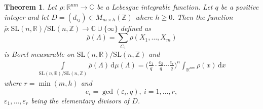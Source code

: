 \documentclass[11pt]{article}
\newtheorem{theorem}{Theorem}[section]
\theoremstyle{definition}
\theoremstyle{proof}
\begin{document}
\begin{theorem}\label{thmii}
    Let $\rho : \mathbb{R}^{nm} \to \mathbb{C}$ be a Lebesgue integrable function.
    Let $q$ be a positive integer and let $D = (d_{ij}) \in M_{m \times h}(\mathbb{Z})$ where $h \geq 0$.
    Then the function $\bar{\rho } : \mathrm{SL}(n,\mathbb{R})/\mathrm{SL}(n,\mathbb{Z}) \to \mathbb{C} \cup \{\infty\}$ defined as
    \begin{equation}\label{lebrhobar}
        \bar{\rho} (\Lambda )  = \sum_{C_1} \rho (X_1, \ldots, X_m)
    \end{equation}
    is Borel measurable on $\mathrm{SL}(n,\mathbb{R})/\mathrm{SL}(n,\mathbb{Z})$ and
    \begin{align}\label{halfrogers}
        \int\limits_{\mathrm{SL}(n,\mathbb{R})/\mathrm{SL}(n,\mathbb{Z})} \bar{\rho } (\Lambda ) \, \mathrm{d} \mu (\Lambda ) = {\bigg(\frac{e_1}{q} \cdot \frac{e_2}{q} \cdots \frac{e_r}{q} \bigg)}^n \int_{\mathbb{R}^{nm}} \rho (x) \, \mathrm{d} x
    \end{align}
    where $r = \min (m, h)$ and
    \[
        e_i = \gcd (\varepsilon _i, q), \ i = 1, \ldots, r,
    \]
    $\varepsilon _1, \ldots, \varepsilon _r$ being the elementary divisors of $D$.
\end{theorem}
\end{document}
